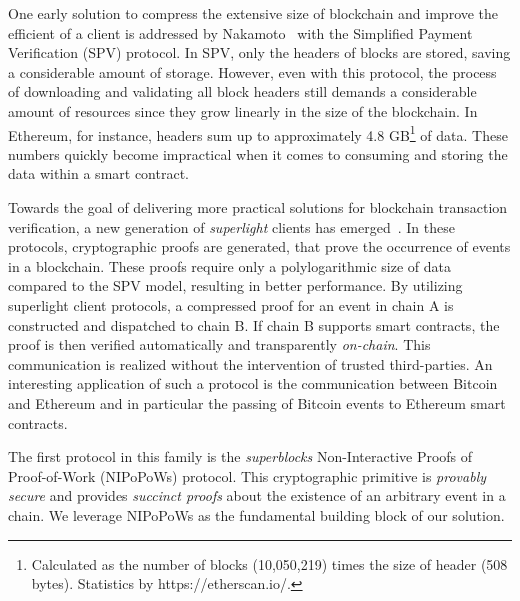 One early solution to compress the extensive size of blockchain and improve the
efficient of a client is addressed by
Nakamoto~\cite{nakamoto} with the Simplified Payment Verification (SPV)
protocol. In SPV, only the headers of blocks are stored, saving a considerable
amount of storage.  However, even with this protocol, the process of
downloading and validating all block headers still demands a considerable
amount of resources since they grow linearly in the size of the blockchain.
In Ethereum, for instance, headers sum up to approximately 4.8
GB\footnote{Calculated as the number of blocks (10,050,219) times the size of
header (508 bytes). Statistics by https://etherscan.io/.} of data.
These numbers quickly become impractical when it comes to consuming and storing the
data within a smart contract.

Towards the goal of delivering more practical solutions for blockchain
transaction verification, a new generation of \emph{superlight}
clients has emerged~\cite{popow,nipopows,compactsuperblocks,flyclient}. In these
protocols, cryptographic proofs are generated, that prove the occurrence of
events in a blockchain. These proofs require only a polylogarithmic size of
data compared to the SPV model, resulting in better performance. By utilizing
superlight client protocols, a compressed proof for an event in chain A is
constructed and dispatched to chain B. If chain B supports smart contracts, the
proof is then verified automatically and transparently \emph{on-chain}. This
communication is realized without the intervention of trusted third-parties.
An interesting application of such a protocol is the communication between
Bitcoin and Ethereum and in particular the passing of Bitcoin events to Ethereum
smart contracts.

The first protocol in this family is the \emph{superblocks} Non-Interactive
Proofs of Proof-of-Work (NIPoPoWs) protocol. This cryptographic primitive is \emph{provably secure} and
provides \emph{succinct proofs} about the existence of an arbitrary event
in a chain. We leverage NIPoPoWs as the fundamental building block of
our solution.

